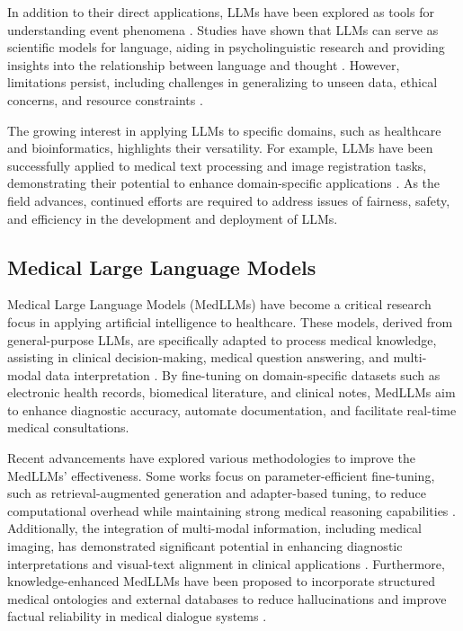 In addition to their direct applications, LLMs have been explored as tools for understanding event phenomena \cite{zhou2022claret,zhou2022eventbert}. Studies have shown that LLMs can serve as scientific models for language, aiding in psycholinguistic research and providing insights into the relationship between language and thought \cite{grindrod2024modelling,houghton2023psycholinguistics}. However, limitations persist, including challenges in generalizing to unseen data, ethical concerns, and resource constraints \cite{veres2022limitations,ali2024survey}.

The growing interest in applying LLMs to specific domains, such as healthcare and bioinformatics, highlights their versatility. For example, LLMs have been successfully applied to medical text processing and image registration tasks, demonstrating their potential to enhance domain-specific applications \cite{ma2024llamareg,liu2024bioinformatics}. As the field advances, continued efforts are required to address issues of fairness, safety, and efficiency in the development and deployment of LLMs.


\subsection{Medical Large Language Models}

Medical Large Language Models (MedLLMs) have become a critical research focus in applying artificial intelligence to healthcare. These models, derived from general-purpose LLMs, are specifically adapted to process medical knowledge, assisting in clinical decision-making, medical question answering, and multi-modal data interpretation \cite{Buhnila2024,He2024}. By fine-tuning on domain-specific datasets such as electronic health records, biomedical literature, and clinical notes, MedLLMs aim to enhance diagnostic accuracy, automate documentation, and facilitate real-time medical consultations.

Recent advancements have explored various methodologies to improve the MedLLMs' effectiveness. Some works focus on parameter-efficient fine-tuning, such as retrieval-augmented generation and adapter-based tuning, to reduce computational overhead while maintaining strong medical reasoning capabilities \cite{Ma2024,Zhang2024}. Additionally, the integration of multi-modal information, including medical imaging, has demonstrated significant potential in enhancing diagnostic interpretations and visual-text alignment in clinical applications \cite{Bai2024}. Furthermore, knowledge-enhanced MedLLMs have been proposed to incorporate structured medical ontologies and external databases to reduce hallucinations and improve factual reliability in medical dialogue systems \cite{Wu2024,Liao2024}.

